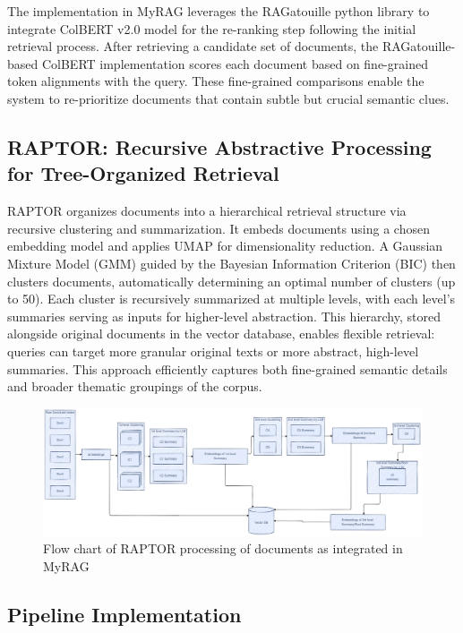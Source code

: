 \documentclass[pdflatex,sn-mathphys-num]{sn-jnl}%
\theoremstyle{thmstyleone}%
\theoremstyle{thmstyletwo}%
\theoremstyle{thmstylethree}%
\begin{document}
The implementation in MyRAG leverages the RAGatouille python library to integrate ColBERT v2.0 model for the re-ranking step following the initial retrieval process. After retrieving a candidate set of documents, the RAGatouille-based ColBERT implementation scores each document based on fine-grained token alignments with the query. These fine-grained comparisons enable the system to re-prioritize documents that contain subtle but crucial semantic clues.


\subsection{RAPTOR: Recursive Abstractive Processing for Tree-Organized Retrieval} \label{subsec3.6}
RAPTOR \cite{wu2021recursively, raptor2024} organizes documents into a hierarchical retrieval structure via recursive clustering and summarization. It embeds documents using a chosen embedding model and applies UMAP for dimensionality reduction. A Gaussian Mixture Model (GMM) guided by the Bayesian Information Criterion (BIC) then clusters documents, automatically determining an optimal number of clusters (up to 50). Each cluster is recursively summarized at multiple levels, with each level’s summaries serving as inputs for higher-level abstraction. This hierarchy, stored alongside original documents in the vector database, enables flexible retrieval: queries can target more granular original texts or more abstract, high-level summaries. This approach efficiently captures both fine-grained semantic details and broader thematic groupings of the corpus.

\begin{figure}[h]
	\centering
	\includegraphics[width=\linewidth]{Raptor.pdf}
	\caption{Flow chart of RAPTOR processing of documents as integrated in MyRAG}
	\label{fig:raptor}
\end{figure}

\subsection{Pipeline Implementation}\label{subsec3.7}
\end{document}
